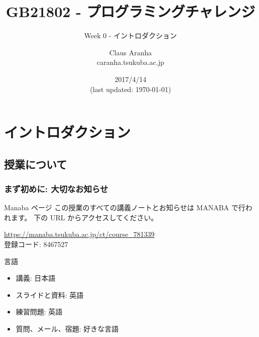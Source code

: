 \documentclass{beamer}
\title[GB21802]{GB21802 - プログラミングチャレンジ}
\subtitle[]{Week 0 - イントロダクション}
\author[Claus Aranha]{Claus Aranha\\{\footnotesize caranha\@@cs.tsukuba.ac.jp}}
\institute{Department of Computer Science}
\date{2017/4/14\\{\smaller(last updated: \today)}}
\begin{document}
\section{イントロダクション}
\subsection{授業について}

\begin{frame}
\maketitle
\end{frame}


\begin{frame}
  \frametitle{まず初めに: 大切なお知らせ}

  \begin{block}{Manaba ページ}
    この授業のすべての講義ノートとお知らせは MANABA で行われます。
    下の URL からアクセスしてください。
    
    \medskip
    
    \url{https://manaba.tsukuba.ac.jp/ct/course_781339}\\
    登録コード: 8467527
  \end{block}
  \begin{exampleblock}{言語}
    \begin{itemize}
      \item 講義: 日本語
      \item スライドと資料: 英語
      \item 練習問題: 英語
      \item 質問、メール、宿題: 好きな言語
    \end{itemize}
  \end{exampleblock}
\end{frame}
\end{document}
